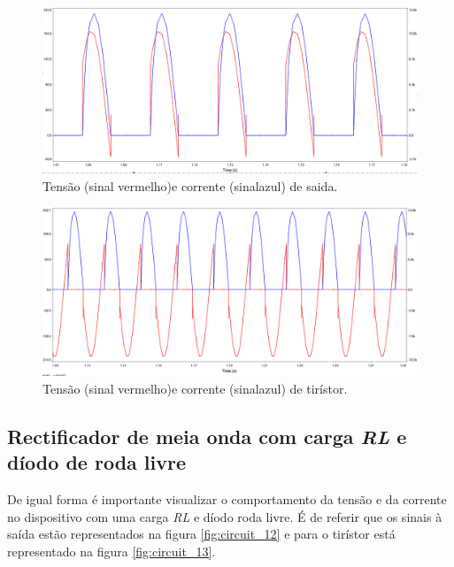 \documentclass[a4paper,11pt]{article}
\numberwithin{equation}{section}
\begin{document}
\begin{figure}[h]
	\centering
	\includegraphics[keepaspectratio=true, scale=0.35]{img/circuito8}
	\caption{Tensão (sinal vermelho)e corrente (sinalazul) de saida.}
	\label{fig:circuit_10}
	\vspace{-0.8em}
\end{figure}

\begin{figure}[h]
	\centering
	\includegraphics[keepaspectratio=true, scale=0.35]{img/circuito9}
	\caption{Tensão (sinal vermelho)e corrente (sinalazul) de tirístor.}
	\label{fig:circuit_11}
	\vspace{-0.8em}
\end{figure}

\subsection{Rectificador de meia onda com carga \textit{RL} e díodo de roda livre}
De igual forma é importante visualizar o comportamento da tensão e da corrente no dispositivo com uma carga \textit{RL} e díodo roda livre. É de referir que os sinais à saída estão representados na figura \ref{fig:circuit_12} e para o tirístor está representado na figura \ref{fig:circuit_13}.
\end{document}
